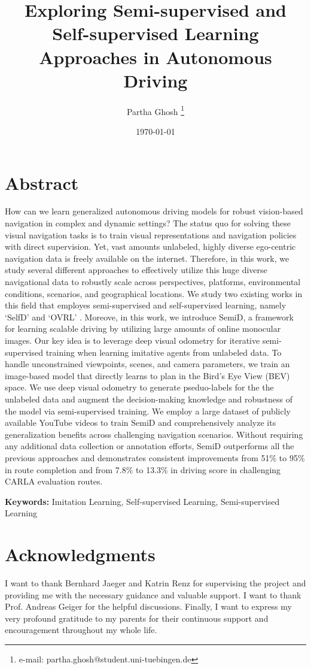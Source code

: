 \documentclass[12pt, letterpaper,cleardoubleempty,BCOR1cm]{scrbook}
\title{Exploring Semi-supervised and Self-supervised Learning Approaches in Autonomous Driving}
\author{Partha Ghosh \thanks{e-mail: partha.ghosh@student.uni-tuebingen.de}}
\date{\today}
\begin{document}


\chapter*{Abstract}
\label{sec:orgbb82c86}
How can we learn generalized autonomous driving models for robust vision-based
 navigation in complex and dynamic settings? The status quo for solving these
 visual navigation tasks is to train visual representations and navigation
 policies with direct supervision. Yet, vast amounts unlabeled, highly
 diverse ego-centric navigation data is freely available on the internet.
 Therefore, in this work, we study several
 different approaches to effectively utilize this huge diverse navigational data to
 robustly scale across perspectives, platforms, environmental conditions,
 scenarios, and geographical locations. We study two existing works in this
 field that employes semi-supervised and self-supervised learning, namely
 `SelfD' \cite{Zhang2022a} and `OVRL' \cite{Yadav2022}. Moreove, in this work,
 we introduce SemiD, a framework for learning scalable driving by utilizing
 large amounts of online monocular images. Our key idea is to leverage deep
 visual odometry for iterative semi-supervised training when learning imitative
 agents from unlabeled data. To handle unconstrained viewpoints, scenes, and
 camera parameters, we train an image-based model that directly learns to plan
 in the Bird’s Eye View (BEV) space. We use deep visual odometry to generate
 pseduo-labels for the the unlabeled data and augment the decision-making
 knowledge and robustness of the model via semi-supervised training. We employ a
 large dataset of publicly available YouTube videos to train SemiD and
 comprehensively analyze its generalization benefits across challenging
 navigation scenarios. Without requiring any additional data collection or
 annotation efforts, SemiD outperforms all the previous approaches and
 demonstrates consistent improvements from 51\% to 95\% in route completion and
 from 7.8\% to 13.3\% in driving score in challenging CARLA evaluation routes.

\textbf{Keywords:} Imitation Learning, Self-supervised Learning, Semi-supervised Learning

\chapter*{Acknowledgments}
\label{sec:org73c1aa3}
I want to thank Bernhard Jaeger and Katrin Renz for supervising the project
and providing me with the necessary guidance and valuable support. I want to
thank Prof. Andreas Geiger for the helpful discussions. Finally, I want to
express my very profound gratitude to my parents for their continuous support
and encouragement throughout my whole life.
\end{document}
